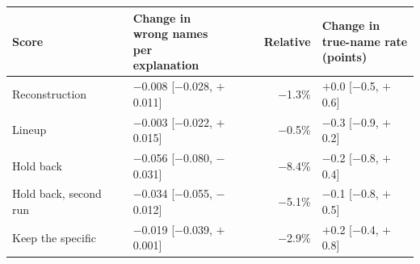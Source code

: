 \begin{tabular}{@{}llrl@{}}
\toprule
Score & \shortstack[l]{Change in\\wrong names\\per\\explanation} & Relative & \shortstack[l]{Change in\\true-name rate\\(points)} \\
\midrule
Reconstruction & $-$0.008 {\scriptsize[$-$0.028, $+$0.011]} & $-$1.3\% & $+$0.0 {\scriptsize[$-$0.5, $+$0.6]} \\
Lineup & $-$0.003 {\scriptsize[$-$0.022, $+$0.015]} & $-$0.5\% & $-$0.3 {\scriptsize[$-$0.9, $+$0.2]} \\
Hold back & $-$0.056 {\scriptsize[$-$0.080, $-$0.031]} & $-$8.4\% & $-$0.2 {\scriptsize[$-$0.8, $+$0.4]} \\
Hold back, second run & $-$0.034 {\scriptsize[$-$0.055, $-$0.012]} & $-$5.1\% & $-$0.1 {\scriptsize[$-$0.8, $+$0.5]} \\
Keep the specific & $-$0.019 {\scriptsize[$-$0.039, $+$0.001]} & $-$2.9\% & $+$0.2 {\scriptsize[$-$0.4, $+$0.8]} \\
\bottomrule
\end{tabular}
